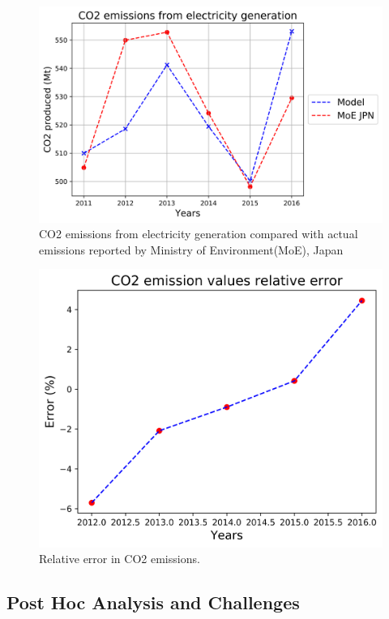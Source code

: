 \documentclass[14pt,a4paper]{article} %
\begin{document}
\begin{figure}[H]
\centering
\includegraphics[scale=0.6]{co2-2016}
\caption{CO2 emissions from electricity generation compared with actual emissions reported by Ministry of Environment(MoE), Japan}
\end{figure}

\begin{figure}[H] \label{co2err}
\centering
\includegraphics[scale=0.6]{co2-err}
\caption{Relative error in CO2 emissions.}
\end{figure}

\subsection{Post Hoc Analysis and Challenges} 
\end{document}
